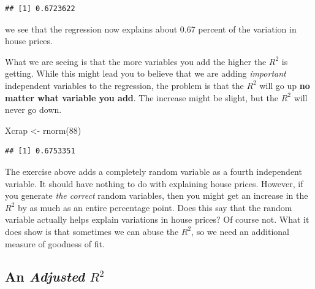 \documentclass[
]{book}
\newenvironment{Shaded}{\begin{snugshade}}{\end{snugshade}}
\newcommand{\AttributeTok}[1]{\textcolor[rgb]{0.77,0.63,0.00}{#1}}
\newcommand{\DecValTok}[1]{\textcolor[rgb]{0.00,0.00,0.81}{#1}}
\newcommand{\FunctionTok}[1]{\textcolor[rgb]{0.00,0.00,0.00}{#1}}
\newcommand{\NormalTok}[1]{#1}
\newcommand{\OtherTok}[1]{\textcolor[rgb]{0.56,0.35,0.01}{#1}}
\newcommand{\SpecialCharTok}[1]{\textcolor[rgb]{0.00,0.00,0.00}{#1}}
\begin{document}
\begin{verbatim}
## [1] 0.6723622
\end{verbatim}

we see that the regression now explains about 0.67 percent of the variation in house prices.

What we are seeing is that the more variables you add the higher the \(R^2\) is getting. While this might lead you to believe that we are adding \emph{important} independent variables to the regression, the problem is that the \(R^2\) will go up \textbf{no matter what variable you add}. The increase might be slight, but the \(R^2\) will never go down.

\begin{Shaded}
\begin{Highlighting}[]
\NormalTok{Xcrap }\OtherTok{\textless{}{-}} \FunctionTok{rnorm}\NormalTok{(}\DecValTok{88}\NormalTok{)}
\end{Highlighting}
\end{Shaded}

\begin{Shaded}
\end{Shaded}

\begin{verbatim}
## [1] 0.6753351
\end{verbatim}

The exercise above adds a completely random variable as a fourth independent variable. It should have nothing to do with explaining house prices. However, if you generate \emph{the correct} random variables, then you might get an increase in the \(R^2\) by as much as an entire percentage point. Does this say that the random variable actually helps explain variations in house prices? Of course not. What it does show is that sometimes we can abuse the \(R^2\), so we need an additional measure of goodness of fit.

\hypertarget{an-adjusted-r2}{%
\subsection{\texorpdfstring{An \emph{Adjusted} \(R^2\)}{An Adjusted R\^{}2}}\label{an-adjusted-r2}}
\end{document}
